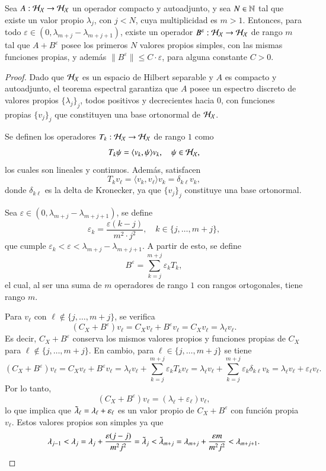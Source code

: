 \begin{prop}
    Sea $A: \mathcal{H}_{\mathcal{X}} \to \mathcal{H}_{\mathcal{X}}$ un operador compacto y autoadjunto, y sea $N \in \mathbb{N}$ tal que existe un valor propio $\lambda_j$, con $j < N$, cuya multiplicidad es $m > 1$. Entonces, para todo $\varepsilon \in (0, \lambda_{m+j} - \lambda_{m+j+1})$, existe un operador $B^\varepsilon: \mathcal{H}_{\mathcal{X}} \to \mathcal{H}_{\mathcal{X}}$ de rango $m$ tal que $A + B^\varepsilon$ posee los primeros $N$ valores propios simples, con las mismas funciones propias, y además $\| B^\varepsilon \| \leq C \cdot \varepsilon$, para alguna constante $C > 0$.
    \label{prop:val_prop_sim}
\end{prop}

\begin{proof}
    Dado que $\mathcal{H}_{\mathcal{X}}$ es un espacio de Hilbert separable y $A$ es compacto y autoadjunto, el teorema espectral \cite{Brezis2011FunctionalEquations} garantiza que $A$ posee un espectro discreto de valores propios $\{ \lambda_j \}_j$, todos positivos y decrecientes hacia $0$, con funciones propias $\{ v_j \}_j$ que constituyen una base ortonormal de $\mathcal{H}_{\mathcal{X}}$.

    Se definen los operadores $T_k : \mathcal{H}_{\mathcal{X}} \to \mathcal{H}_{\mathcal{X}}$ de rango $1$ como
    \[
    T_k \psi = \langle v_k, \psi \rangle v_k, \quad \psi \in \mathcal{H}_{\mathcal{X}},
    \]
    los cuales son lineales y continuos. Además, satisfacen
    \[
    T_k v_\ell = \langle v_k, v_\ell \rangle v_k = \delta_{k \ell} v_k,
    \]
    donde $\delta_{k \ell}$ es la delta de Kronecker, ya que $\{ v_j \}_j$ constituye una base ortonormal.

    Sea $\varepsilon \in (0, \lambda_{m+j} - \lambda_{m+j+1})$, se define
    \[
    \varepsilon_k = \frac{\varepsilon (k-j)}{m^2 \cdot j^2}, \quad k \in \{ j, \dots , m+j \},
    \]
    que cumple $\varepsilon_k < \varepsilon < \lambda_{m+j} - \lambda_{m+j+1}$. A partir de esto, se define 
    \[
    B^\varepsilon = \sum_{k=j}^{m+j} \varepsilon_k T_k,
    \]
    el cual, al ser una suma de $m$ operadores de rango $1$ con rangos ortogonales, tiene rango $m$.

    Para \( v_\ell \) con $\ell \notin \{ j, \dots, m+j \}$, se verifica
    \[
    (C_X + B^\varepsilon) v_\ell = C_X v_\ell + B^\varepsilon v_\ell = C_X v_\ell = \lambda_\ell v_\ell.
    \]
    Es decir, $C_X + B^\varepsilon$ conserva los mismos valores propios y funciones propias de $C_X$ para $\ell \notin \{ j, \dots, m+j \}$. En cambio, para $\ell \in \{ j, \dots, m+j \}$ se tiene
    \[
    (C_X + B^\varepsilon) v_\ell = C_X v_\ell + B^\varepsilon v_\ell = \lambda_\ell v_\ell + \sum_{k=j}^{m+j} \varepsilon_k T_k v_\ell = \lambda_\ell v_\ell + \sum_{k=j}^{m+j} \varepsilon_k \delta_{k \ell} v_k = \lambda_\ell v_\ell + \varepsilon_\ell v_\ell.
    \]
    Por lo tanto,
    \[
    (C_X + B^\varepsilon)v_\ell = (\lambda_\ell + \varepsilon_\ell) v_\ell,
    \]
    lo que implica que $\Tilde{\lambda}_\ell = \lambda_\ell + \varepsilon_\ell$ es un valor propio de $C_X + B^\varepsilon$ con función propia $v_\ell$. Estos valores propios son simples ya que
    \[
    \lambda_{j-1} < \lambda_j = \lambda_j + \frac{\varepsilon (j-j)}{m^2 j^2} = \Tilde{\lambda}_j < \Tilde{\lambda}_{m+j} = \lambda_{m+j} + \frac{\varepsilon m}{m^2 j^2} < \lambda_{m+j+1}.
    \]


\end{proof}
